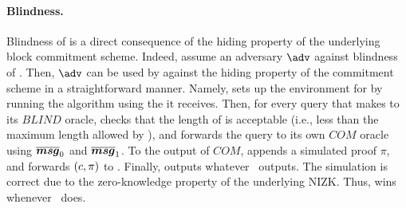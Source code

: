 \paragraph{Blindness.}
Blindness of \SBCM is a direct consequence of the hiding property of the
underlying block commitment scheme. Indeed, assume an adversary $\adv$ against
blindness of \SBCM. Then, $\adv$ can be used by \advB against the hiding
property of the commitment scheme in a straightforward manner. Namely, \advB
sets up the environment for \adv by running the \KeyGen algorithm using the
\vk it receives. Then, for every query that \adv makes to its $BLIND$ oracle,
\advB checks that the length of \smsg is acceptable (i.e., less than the
maximum length allowed by \SBCM), and forwards the query to its own $COM$
oracle using $\overline{\boldsymbol{msg}}_0$ and $\overline{\boldsymbol{msg}}_1$. To the output \Ccom of $COM$, \advB
appends a simulated proof $\pi$, and forwards $(c,\pi)$ to \adv. Finally,
\advB outputs whatever \adv~outputs. The simulation is correct due to the
zero-knowledge property of the underlying NIZK. Thus, \advB wins whenever
\adv~does.

